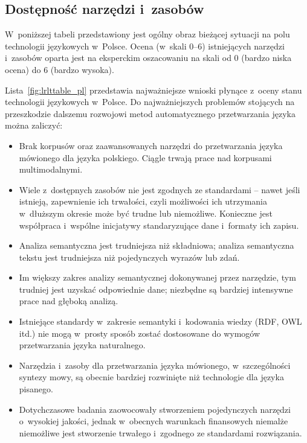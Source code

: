\begin{multicols}{2}
\subsection[Dostępność narzędzi i~zasobów]{Dostępność
narzędzi i~zasobów} W~poniższej tabeli przedstawiony jest ogólny
obraz bieżącej sytuacji na polu technologii językowych w~Polsce.
Ocena (w~skali 0--6) istniejących narzędzi i~zasobów oparta jest na
eksperckim oszacowaniu na skali od 0 (bardzo niska ocena) do 6 (bardzo
wysoka). 

Lista~\ref{fig:lrlttable_pl} przedstawia najważniejsze wnioski
płynące z~oceny stanu technologii językowych w~Polsce. Do
najważniejszych problemów stojących na przeszkodzie dalszemu
rozwojowi metod automatycznego przetwarzania języka można zaliczyć: 

\begin{itemize} \item Brak korpusów oraz zaawansowanych narzędzi do
przetwarzania języka mówionego dla języka polskiego. Ciągle
trwają prace nad korpusami multimodalnymi. \item Wiele z~dostępnych
zasobów nie jest zgodnych ze standardami – nawet jeśli istnieją,
zapewnienie ich trwałości, czyli możliwości ich utrzymania
w~dłuższym okresie może być trudne lub niemożliwe. Konieczne jest
współpraca i~wspólne inicjatywy standaryzujące dane i~formaty ich
zapisu. \item Analiza semantyczna jest trudniejsza niż składniowa;
analiza semantyczna tekstu jest trudniejsza niż pojedynczych wyrazów
lub zdań. \item Im większy zakres analizy semantycznej dokonywanej
przez narzędzie, tym trudniej jest uzyskać odpowiednie dane;
niezbędne są bardziej intensywne prace nad głęboką analizą.
\item Istniejące standardy w~zakresie semantyki i~kodowania wiedzy
(RDF, OWL itd.) nie mogą w~prosty sposób zostać dostosowane do
wymogów przetwarzania języka naturalnego. \item Narzędzia i~zasoby
dla przetwarzania języka mówionego, w~szczególności syntezy mowy,
są obecnie bardziej rozwinięte niż technologie dla języka
pisanego. \item Dotychczasowe badania zaowocowały stworzeniem
pojedynczych narzędzi o~wysokiej jakości, jednak w~obecnych
warunkach finansowych niemalże niemożliwe jest stworzenie trwałego
i~zgodnego ze standardami rozwiązania. \end{itemize} 


\end{multicols}
